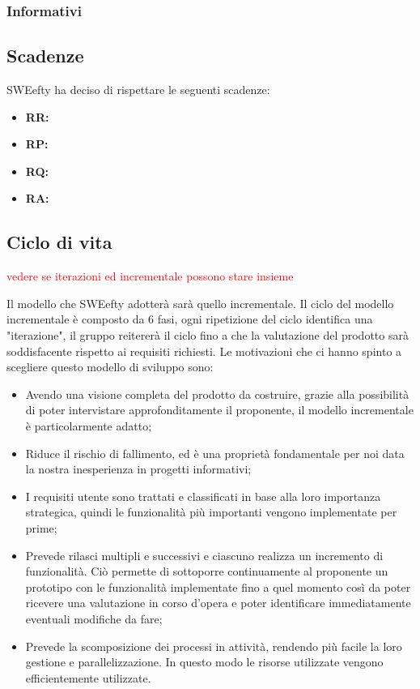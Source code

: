 			\subsubsection{Informativi}
	\subsection{Scadenze}
	SWEefty ha deciso di rispettare le seguenti scadenze:
	\begin{itemize}
		\item \textbf{RR:}
		\item \textbf{RP:}
		\item \textbf{RQ:}
		\item \textbf{RA:}
	\end{itemize}
	\subsection{Ciclo di vita}
	\textcolor{red}{vedere se iterazioni ed incrementale possono stare insieme}
	
	Il modello che SWEefty adotterà sarà quello incrementale. Il ciclo del modello incrementale è composto da 6 fasi, ogni ripetizione del ciclo identifica una "iterazione", il gruppo reitererà il ciclo fino a che la valutazione del prodotto sarà soddisfacente rispetto ai requisiti richiesti.
	Le motivazioni che ci hanno spinto a scegliere questo modello di sviluppo sono:
	\begin{itemize}
		\item Avendo una visione completa del prodotto da costruire, grazie alla possibilità di poter intervistare approfonditamente il proponente, il modello incrementale è particolarmente adatto;
		\item Riduce il rischio di fallimento, ed è una proprietà fondamentale per noi data la nostra inesperienza in progetti informativi;
		\item I requisiti utente sono trattati e classificati in base alla loro importanza strategica, quindi le funzionalità più importanti vengono implementate per prime;
		\item Prevede rilasci multipli e successivi e ciascuno realizza un incremento di funzionalità. Ciò permette di sottoporre continuamente al proponente un prototipo con le funzionalità implementate fino a quel momento così da poter ricevere una valutazione in corso d'opera e poter identificare immediatamente eventuali modifiche da fare;
		\item Prevede la scomposizione dei processi in attività, rendendo più facile la loro gestione e parallelizzazione. In questo modo le risorse utilizzate vengono efficientemente utilizzate.
	\end{itemize}
